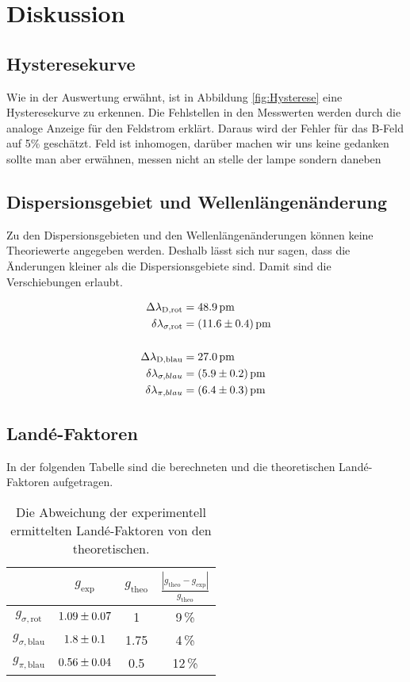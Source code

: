 \section{Diskussion}
\label{sec:Diskussion}
\subsection{Hysteresekurve}
Wie in der Auswertung erwähnt, ist in Abbildung \eqref{fig:Hysterese} eine Hysteresekurve zu erkennen. Die Fehlstellen in den Messwerten werden durch die analoge Anzeige für den Feldstrom erklärt. Daraus wird der Fehler für das B-Feld auf 5\% geschätzt.
Feld ist inhomogen, darüber machen wir uns keine gedanken sollte man aber erwähnen, messen nicht an stelle der lampe sondern daneben

\subsection{Dispersionsgebiet und Wellenlängenänderung}
Zu den Dispersionsgebieten und den Wellenlängenänderungen können keine Theoriewerte angegeben werden. Deshalb lässt sich nur sagen, dass die Änderungen kleiner als die Dispersionsgebiete sind. Damit sind die Verschiebungen erlaubt.

\begin{align*}
  \Delta\lambda_\text{D,rot} &= 48.9\,\text{pm} \\
  \delta \lambda_{\sigma,\text{rot}} &= (\num{11.6 +- 0.4})\,\text{pm} \\
  \\
  \Delta\lambda_\text{D,blau} &= 27.0\,\text{pm} \\
  \delta \lambda_{\sigma,blau} &= (\num{5.9 +- 0.2})\,\text{pm} \\
  \delta \lambda_{\pi,blau} &= (\num{6.4 +- 0.3})\,\text{pm}
\end{align*}


\subsection{Landé-Faktoren}
In der folgenden Tabelle sind die berechneten und die theoretischen Landé-Faktoren aufgetragen.

\begin{table}[H]
   \centering
   \caption{Die Abweichung der experimentell ermittelten Landé-Faktoren von den theoretischen.}
   \label{tab:}
   \begin{tabular}{c|c|c|c}
     & $g_\text{exp}$ & $g_\text{theo}$ & $\frac{|g_\text{theo} - g_\text{exp}|}{g_\text{theo}}$ \\
     \hline
     $g_{\sigma,\text{rot}}$  & $\num{1.09 +- 0.07}$ & 1 & 9\,\% \\
     $g_{\sigma,\text{blau}}$ & $\num{1.8 +- 0.1}$   & 1.75 & 4\,\% \\
     $g_{\pi,\text{blau}}$    & $\num{0.56 +- 0.04}$ & 0.5 & 12\,\% \\
   \end{tabular}
\end{table}

